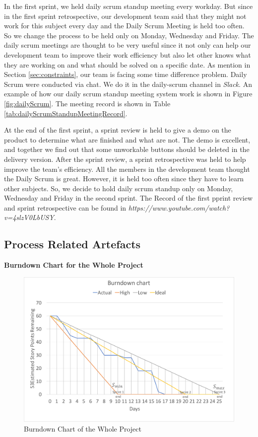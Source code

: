 \documentclass{report}
\begin{document}
In the first sprint, we held daily scrum standup meeting every workday. But since in the first sprint retrospective, our development team said that they might not work for this subject every day and the Daily Scrum Meeting is held too often. So we change the process to be held only on Monday, Wednesday and Friday. The daily scrum meetings are thought to be very useful since it not only can help our development team to improve their work efficiency but also let other knows what they are working on and what should be solved on a specific date. As mention in Section \ref{sec:constraints}, our team is facing some time difference problem. Daily Scrum were conducted via chat. We do it in the daily-scrum channel in \textit{Slack}. An example of how our daily scrum standup meeting system work is shown in Figure \ref{fig:dailyScrum}. The meeting record is shown in Table \ref{tab:dailyScrumStandupMeetingRecord}.

At the end of the first sprint, a sprint review is held to give a demo on the product to determine what are finished and what are not. The demo is excellent, and together we find out that some unworkable buttons should be deleted in the delivery version. After the sprint review, a sprint retrospective was held to help improve the team's efficiency. All the members in the development team thought the Daily Scrum is great. However, it is held too often since they have to learn other subjects. So, we decide to hold daily scrum standup only on Monday, Wednesday and Friday in the second sprint. The Record of the first pprint review and sprint retrospective can be found in \textit{https://www.youtube.com/watch?v=4slzV0LbUSY}.

\clearpage
\subsection{Process Related Artefacts}
\textbf{Burndown Chart for the Whole Project}

\begin{figure}[htp]
\centering
\includegraphics[width=\textwidth]{Figures/totalBurndown.pdf}
\caption{Burndown Chart of the Whole Project}
\label{fig:totalBurndown}
\end{figure}
\end{document}
